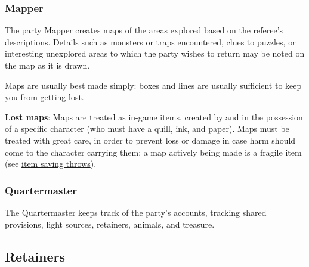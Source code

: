 \documentclass{book}
\begin{document}
\subsubsection*{Mapper}\label{mapper}

The party Mapper creates maps of the areas explored based on the
referee's descriptions. Details such as monsters or traps encountered,
clues to puzzles, or interesting unexplored areas to which the party
wishes to return may be noted on the map as it is drawn.

Maps are usually best made simply: boxes and lines are usually
sufficient to keep you from getting lost.

\textbf{Lost maps}: Maps are treated as in-game items, created by and in
the possession of a specific character (who must have a quill, ink, and
paper). Maps must be treated with great care, in order to prevent loss
or damage in case harm should come to the character carrying them; a map
actively being made is a fragile item (see
\hyperref[item-saving-throws]{item saving throws}).

\subsubsection*{Quartermaster}\label{quartermaster}

The Quartermaster keeps track of the party's accounts, tracking shared
provisions, light sources, retainers, animals, and treasure.

\subsection*{Retainers}\label{retainers}
\end{document}
